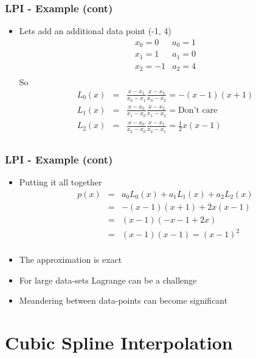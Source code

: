 \documentclass[10pt]{beamer}
\begin{document}
\begin{frame}
  \frametitle{LPI - Example (cont)}
  \begin{itemize}
  \item Lets add an additional data point (-1, 4)
    \[
      \begin{array}{ll}
        x_0 = 0 & a_0 = 1 \\
        x_1 = 1 & a_1 = 0 \\
        x_2 = -1& a_2 = 4 \\
      \end{array}
    \]
    So
    \[
      \begin{array}{lll}
        L_0(x) & = & \frac{x-x_1}{x_0-x_1} \frac{x - x_2}{x_0-x_2} = -(x-1)(x+1)\\
        L_1(x) & = & \frac{x-x_0}{x_1-x_0} \frac{x - x_2}{x_1-x_2} = \mbox{Don't care}\\
        L_2(x) & = & \frac{x-x_0}{x_2-x_0} \frac{x - x_1}{x_2-x_1} = \frac{1}{2} x (x-1)\\
      \end{array}
    \]
  \end{itemize}
\end{frame}

\begin{frame}
  \frametitle{LPI - Example (cont)}
  \begin{itemize}
  \item Putting it all together
    \[
      \begin{array}{lll}
        p(x) & = & a_0 L_0(x) + a_1 L_1(x) + a_2 L_2(x)\\
             & = & -(x-1)(x+1) + 2 x (x-1) \\
             & = & (x-1) ( -x - 1 + 2x)\\
             & = & (x-1) (x-1) = (x-1)^2\\
      \end{array}
    \] \pause
    \item The approximation is exact
    \item For large data-sets Lagrange can be a challenge
    \item Meandering between data-points can become significant
  \end{itemize}
\end{frame}

\section{Cubic Spline Interpolation}
\end{document}

